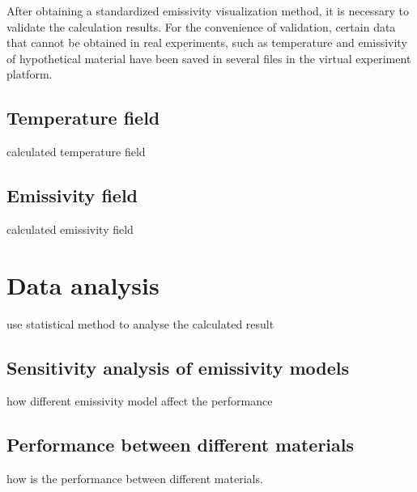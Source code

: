 After obtaining a standardized emissivity visualization method, it is necessary to validate the 
calculation results. For the convenience of validation, certain data that cannot be 
obtained in real experiments, such as temperature and emissivity of hypothetical material 
have been saved in several files in the virtual experiment platform.

\subsection{Temperature field}
calculated temperature field
\subsection{Emissivity field}
calculated emissivity field
\section{Data analysis}
use statistical method to analyse the calculated result
\subsection{Sensitivity analysis of emissivity models}
how different emissivity model affect the performance 
\subsection{Performance between different materials}
how is the performance between different materials.